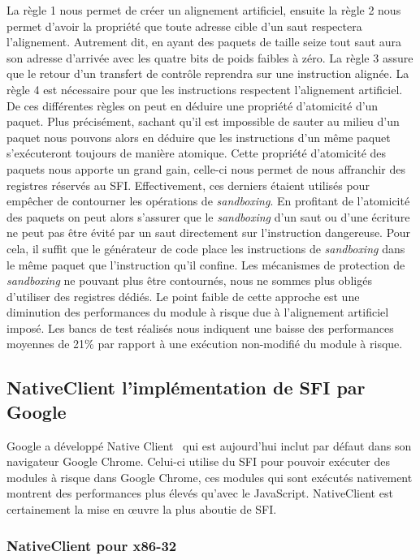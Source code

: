\documentclass[11pt]{sdm}
\begin{document}
	La règle 1 nous permet de créer un alignement artificiel, ensuite la règle 2 nous permet d'avoir la propriété que toute adresse cible d'un saut respectera l'alignement. Autrement dit, en ayant des paquets de taille seize tout saut aura son adresse d'arrivée avec les quatre bits de poids faibles à zéro.
	La règle 3 assure que le retour d'un transfert de contrôle reprendra sur une instruction alignée. La règle 4 est nécessaire pour que les instructions respectent l'alignement artificiel. De ces différentes règles on peut en déduire une propriété d'atomicité d'un paquet. Plus précisément, sachant qu'il est impossible de sauter au milieu d'un paquet nous pouvons alors en déduire que les instructions d'un même paquet s'exécuteront toujours de manière atomique.
	Cette propriété d'atomicité des paquets nous apporte un grand gain, celle-ci nous permet de nous affranchir des registres réservés au SFI. Effectivement, ces derniers étaient utilisés pour empêcher de contourner les opérations de \textit{sandboxing}. En profitant de l'atomicité des paquets on peut alors s'assurer que le \textit{sandboxing} d'un saut ou d'une écriture ne peut pas être évité par un saut directement sur l'instruction dangereuse. Pour cela, il suffit que le générateur de code place les instructions de \textit{sandboxing} dans le même paquet que l'instruction qu'il confine. Les mécanismes de protection de \textit{sandboxing} ne pouvant plus être contournés, nous ne sommes plus obligés d'utiliser des registres dédiés. 
	Le point faible de cette approche est une diminution des performances du module à risque due à l'alignement artificiel imposé. Les bancs de test réalisés nous indiquent une baisse des performances moyennes de 21\% par rapport à une exécution non-modifié du module à risque.


\subsection{NativeClient l'implémentation de SFI par Google}

Google a développé Native Client~\cite{Yee:2010:NCS:1629175.1629203} qui est aujourd'hui inclut par défaut dans son navigateur Google Chrome. Celui-ci utilise du SFI pour pouvoir exécuter des modules à risque dans Google Chrome, ces modules qui sont exécutés nativement montrent des performances plus élevés qu'avec le JavaScript.
NativeClient est certainement la mise en œuvre la plus aboutie de SFI. 

\subsubsection{NativeClient pour x86-32}
\end{document}
